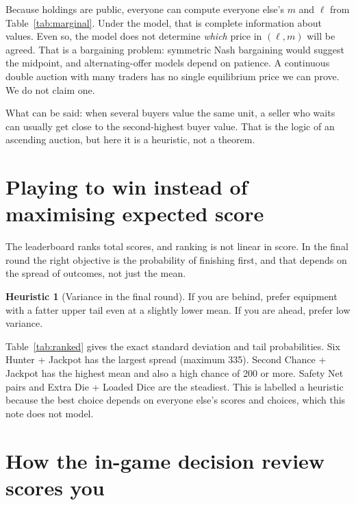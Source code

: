 \documentclass[11pt]{article}
\theoremstyle{definition}
\newtheorem{heuristic}[theorem]{Heuristic}
\begin{document}
Because holdings are public, everyone can compute everyone else's $m$ and $\ell$ from Table~\ref{tab:marginal}. Under the model, that is complete information about values. Even so, the model does not determine \emph{which} price in $(\ell, m)$ will be agreed. That is a bargaining problem: symmetric Nash bargaining would suggest the midpoint, and alternating-offer models depend on patience. A continuous double auction with many traders has no single equilibrium price we can prove. We do not claim one.

What can be said: when several buyers value the same unit, a seller who waits can usually get close to the second-highest buyer value. That is the logic of an ascending auction, but here it is a heuristic, not a theorem.

\section{Playing to win instead of maximising expected score}\label{sec:rank}

The leaderboard ranks total scores, and ranking is not linear in score. In the final round the right objective is the probability of finishing first, and that depends on the spread of outcomes, not just the mean.

\begin{heuristic}[Variance in the final round]
If you are behind, prefer equipment with a fatter upper tail even at a slightly lower mean. If you are ahead, prefer low variance.
\end{heuristic}
Table~\ref{tab:ranked} gives the exact standard deviation and tail probabilities. Six Hunter + Jackpot has the largest spread (maximum 335). Second Chance + Jackpot has the highest mean and also a high chance of 200 or more. Safety Net pairs and Extra Die + Loaded Dice are the steadiest. This is labelled a heuristic because the best choice depends on everyone else's scores and choices, which this note does not model.

\begin{table}[ht]\centering\small
\TableRanked
\caption{Every equipment option ranked by exact expected payout $\mu$, with standard deviation $\sigma$, exact tail probabilities and the maximum possible payout.}\label{tab:ranked}
\end{table}

\section{How the in-game decision review scores you}\label{sec:review}
\end{document}

